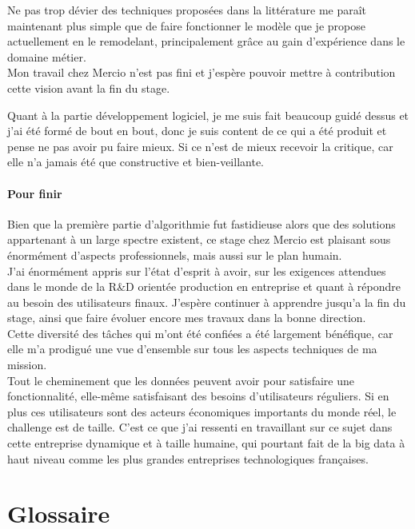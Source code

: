 \documentclass{rapportCS}
\begin{document}
Ne pas trop dévier des techniques proposées dans la littérature me paraît maintenant plus simple
que de faire fonctionner le modèle que je propose actuellement en le remodelant, principalement
grâce au gain d'expérience dans le domaine métier.\\

Mon travail chez Mercio n'est pas fini et j'espère pouvoir mettre à contribution cette vision avant 
la fin du stage.

Quant à la partie développement logiciel, je me suis fait beaucoup guidé dessus et j'ai été formé
de bout en bout, donc je suis content de ce qui a été produit et pense ne pas avoir pu faire mieux.
Si ce n'est de mieux recevoir la critique, car elle n'a jamais été que constructive et bien-veillante.

\paragraph{Pour finir}
Bien que la première partie d'algorithmie fut fastidieuse alors que des solutions appartenant
à un large spectre existent, ce stage chez Mercio est plaisant
sous énormément d'aspects professionnels, mais aussi sur le plan humain.\\

J'ai énormément appris sur l'état d'esprit à avoir,
sur les exigences attendues dans le monde de la R\&D orientée production en entreprise et quant
à répondre au besoin des utilisateurs finaux. J'espère continuer à apprendre jusqu'a la fin 
du stage, ainsi que faire évoluer encore mes travaux dans la bonne direction. \\

Cette diversité des tâches qui m'ont été confiées a été largement bénéfique, car elle m'a prodigué
une vue d'ensemble sur tous les aspects techniques de ma mission.\\
Tout le cheminement que les données peuvent avoir pour satisfaire une fonctionnalité, elle-même
satisfaisant des besoins d'utilisateurs réguliers.
Si en plus ces utilisateurs sont des acteurs économiques importants du monde réel, le challenge
est de taille. C'est ce que j'ai ressenti en travaillant sur ce sujet dans cette entreprise 
dynamique et à taille humaine, qui pourtant fait de la big data à haut niveau comme les plus grandes
entreprises technologiques françaises.\\

\newpage
\section{Glossaire\label{glossaire}}
\end{document}

